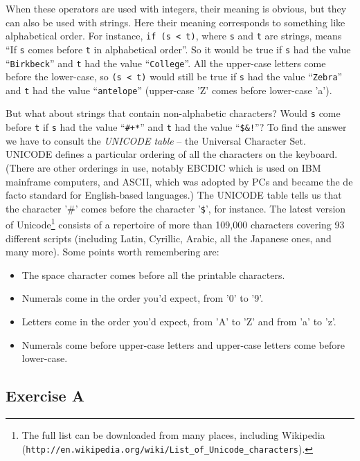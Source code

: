 When these operators are used with integers, their meaning is obvious,
but they can also be used with strings.  Here their meaning corresponds
to something like alphabetical order.  For instance, \verb!if (s < t)!,
where  \verb!s! and \verb!t! are strings, means ``If  \verb!s! comes before \verb!t!
in alphabetical order''.  So it would be true if  \verb!s! had the value
``\verb!Birkbeck!'' and \verb!t! had the value ``\verb!College!''.  All the
upper-case letters come before the lower-case, so \verb!(s < t)! would
still be true if  \verb!s! had the value ``\verb!Zebra!'' and \verb!t! had the
value ``\verb!antelope!'' (upper-case 'Z' comes before lower-case 'a').

But what about strings that contain non-alphabetic characters?  Would
\verb!s!  come before \verb!t! if \verb!s! had the value ``\verb!#+*!''
and \verb!t! had the value ``\verb+$&!+''?  To find the answer we have
to consult the \emph{UNICODE table} -- the Universal Character Set.
UNICODE defines a particular ordering of all the characters on the
keyboard.  (There are other orderings in use, notably EBCDIC which is
used on IBM mainframe computers, and ASCII, which was adopted by PCs and
became the de facto standard for English-based languages.)
The UNICODE table tells us that the character '\#' comes before the
character '\verb!$!', for instance.  The latest version of Unicode\footnote{The full list can be downloaded from many
places, including Wikipedia
(\texttt{http://en.wikipedia.org/wiki/List\_of\_Unicode\_characters}).}
consists of a repertoire of more than 109,000 characters covering 93
different scripts (including Latin, Cyrillic, Arabic, all the Japanese
ones, and many more). Some points worth remembering are:

\begin{itemize}
\item
The space character comes before all the printable characters.
\item
Numerals come in the order you'd expect, from '0' to '9'.
\item
Letters come in the order you'd expect, from 'A' to 'Z' and from 'a' to 'z'.
\item
Numerals come before upper-case letters and upper-case letters come before lower-case.
\end{itemize}

\subsection*{Exercise A}


